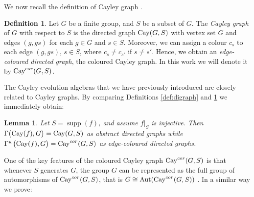 \documentclass[a4paper,12pt]{amsart}
\newtheorem{lemma}[theorem]{Lemma}
\theoremstyle{definition}
\newtheorem{definition}[theorem]{Definition}
\theoremstyle{remark}
\newcommand{\Aut}{\operatorname{Aut}}
\newcommand{\Cay}{{\rm Cay}}
\newcommand{\supp}{\operatorname{supp}}
\begin{document}

We now recall the definition of Cayley graph \cite[Definition 4-5]{CayleyGraph}.

\begin{definition}\label{def:cayley_graph}
Let $G$ be a finite group, and $S$ be a subset of $G$. The \textit{Cayley graph} of $G$ with respect to $S$ is the directed graph $\Cay(G,S)$ with vertex set $G$ and edges $(g,gs)$ for each $g\in G$ and $s\in S$.
Moreover, we can assign a colour $c_s$  to each edge  $(g,gs)$,  $s\in S$, where $c_s\ne c_{s'}$ if $s\ne s'$. Hence, we obtain an  \textit{edge-coloured directed graph}, the coloured Cayley graph. In this work we will denote it by $\Cay^{cor}(G,S)$.\end{definition}

The Cayley evolution algebras that we have previously introduced are closely related to Cayley graphs. By comparing Definitions \ref{def:digraph} and \ref{def:cayley_graph}  we immediately obtain:

 \begin{lemma}\label{lem:graph_of_cayley_is_cayley}
Let $S=\supp(f)$, and assume $f|_S$ is injective. Then $\Gamma\big(\Cay(f),G\big)=\Cay(G,S)$ as abstract directed graphs while  $\Gamma^w\big(\Cay(f),G\big)=\Cay^{cor}(G,S)$ as edge-coloured directed graphs.
 \end{lemma}

One of the key features of the coloured Cayley graph $\Cay^{cor}(G,S)$ is that whenever $S$ generates $G$, the group $G$ can be represented as the full group of automorphisms of $\Cay^{cor}(G,S)$, that is $G\cong \Aut (\Cay^{cor}(G,S))$ \cite[Theorem 4-8]{CayleyGraph}. In a similar way we prove:
\end{document}
